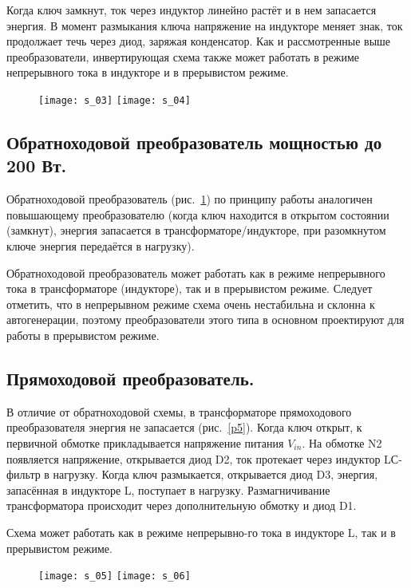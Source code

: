 	Когда ключ замкнут, ток через индуктор линейно растёт и в нем запасается энергия. В момент размыкания ключа напряжение на индукторе меняет знак, ток продолжает течь через диод, заряжая конденсатор. 
Как и рассмотренные выше преобразователи, инвертирующая схема также может работать в режиме непрерывного тока в индукторе и в прерывистом режиме.

\begin{figure}[ht]
	\texttt{[image: s\_03]} \hfill
	\texttt{[image: s\_04]}
	\parbox{.45\textwidth}{\caption{}\label{p3}} \hfill
	\parbox{.45\textwidth}{\caption{}\label{p4}}
\end{figure}

\subsection{Обратноходовой преобразователь мощностью до 200 Вт.}

	Обратноходовой преобразователь (рис.~\ref{p4}) по принципу работы аналогичен повышающему преобразователю (когда ключ находится в открытом состоянии (замкнут), энергия запасается в трансформаторе/индукторе, при разомкнутом ключе энергия передаётся в нагрузку).
	
	Обратноходовой преобразователь может работать как в режиме непрерывного тока в трансформаторе (индукторе), так и в прерывистом режиме. Следует отметить, что в непрерывном режиме схема очень нестабильна и склонна к автогенерации, поэтому преобразователи этого типа в основном проектируют для работы в прерывистом режиме.

\subsection{Прямоходовой преобразователь.}

	В отличие от обратноходовой схемы, в трансформаторе прямоходового преобразователя энергия не запасается (рис.~\ref{p5}). Когда ключ открыт, к первичной обмотке прикладывается напряжение питания $ V_{in} $. На обмотке N2 появляется напряжение, открывается диод D2, ток протекает через индуктор LС-фильтр в нагрузку. Когда ключ размыкается, 
открывается диод D3, энергия, запасённая в индукторе L, поступает в нагрузку. Размагничивание трансформатора происходит через дополнительную обмотку и диод D1.

	Схема может работать как в режиме непрерывно-го тока в индукторе L, так и в прерывистом режиме.

\begin{figure}[ht]
	\texttt{[image: s\_05]} \hfill
	\texttt{[image: s\_06]}
	\parbox{.45\textwidth}{\caption{}\label{p5}} \hfill
	\parbox{.45\textwidth}{\caption{}\label{p6}}
\end{figure}

